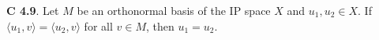 {\bf C 4.9}. Let $M$ be an orthonormal basis of the IP space $X$ and $u_1, u_2 \in X$. If $\langle u_1, v\rangle=\langle u_2, v \rangle$ for all $v \in M$, then $u_1=u_2$. 
